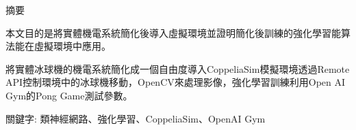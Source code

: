 \begin{center}
\fontsize{11pt}{0}\sectionef
摘要
\end{center}
\begin{flushleft}
\qquad 本文目的是將實體機電系統簡化後導入虛擬環境並證明簡化後訓練的強化學習能算法能在虛擬環境中應用。

\qquad 將實體冰球機的機電系統簡化成一個自由度導入CoppeliaSim模擬環境透過Remote API控制環境中的冰球機移動，OpenCV來處理影像，強化學習訓練利用Open AI Gym的Pong Game測試參數。

\end{flushleft}
\begin{center}
\fontsize{10pt}{20pt}\selectfont 關鍵字: 類神經網路、強化學習、\sectionef CoppeliaSim、OpenAI Gym
\end{center}